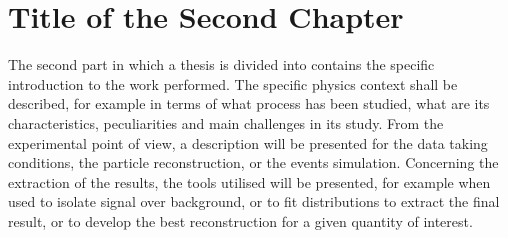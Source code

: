 \chapter{Title of the Second Chapter}

The second part in which a thesis is divided into
contains the specific introduction to the work performed.
The specific physics context shall be described,
for example in terms of what process has been studied,
what are its characteristics,
peculiarities
and main challenges in its study.
From the experimental point of view, 
a description will be presented for 
the data taking conditions, 
the particle reconstruction,
or the events simulation.
Concerning the extraction of the results,
the tools utilised will be presented, 
for example when used to isolate signal over background,
or to fit distributions to extract the final result,
or to develop the best reconstruction for a given quantity of interest.

